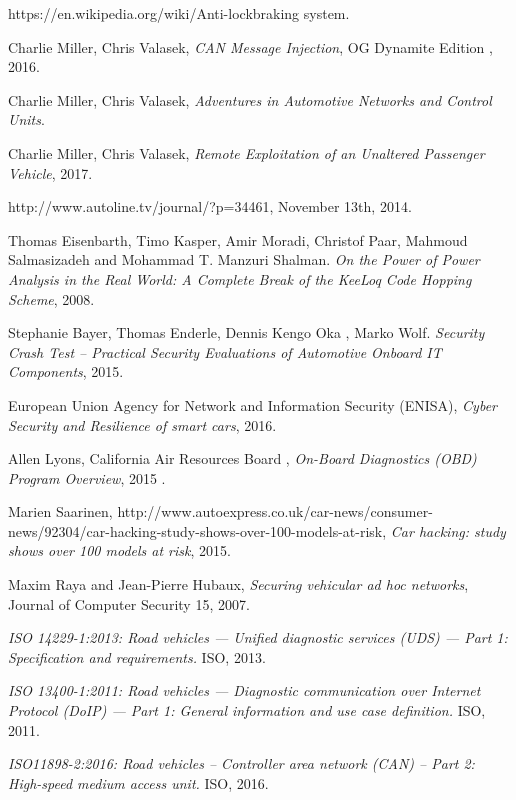 \documentclass[11pt]{article}
\begin{document}
\begin{thebibliography}{10}
	https://en.wikipedia.org/wiki/Anti-lock\textunderscore braking \textunderscore system.
	
	Charlie Miller, Chris Valasek,
	\textit{CAN Message Injection},
	OG Dynamite Edition
	, 2016.

	Charlie Miller, Chris Valasek,
	\textit{Adventures in Automotive Networks and Control Units}.
	
	Charlie Miller, Chris Valasek,
	\textit{Remote Exploitation of an Unaltered Passenger Vehicle}, 2017.
	
	http://www.autoline.tv/journal/?p=34461, November 13th, 2014.
	
	Thomas Eisenbarth, Timo Kasper, Amir Moradi, Christof Paar, Mahmoud Salmasizadeh and Mohammad T. Manzuri Shalman.
	\textit{On the Power of Power Analysis in the Real World: A Complete Break of the KeeLoq Code Hopping Scheme}, 2008.
	
	Stephanie Bayer, Thomas Enderle, Dennis Kengo Oka , Marko Wolf.
	\textit{Security Crash Test – Practical Security Evaluations of Automotive Onboard IT Components}, 2015.
	
	European Union Agency for Network and Information Security (ENISA),
	\textit{Cyber Security and Resilience of smart cars},
	2016.
	
	Allen Lyons, California Air Resources Board ,
	\textit{On-Board Diagnostics (OBD) Program Overview},
	2015 .
	
	Marien Saarinen, http://www.autoexpress.co.uk/car-news/consumer-news/92304/car-hacking-study-shows-over-100-models-at-risk, 
	\textit{Car hacking: study shows over 100 models at risk},
	2015.
	
	Maxim Raya and Jean-Pierre Hubaux, \textit{Securing vehicular ad hoc networks}, Journal of Computer Security 15, 2007.

	\textit{ISO 14229-1:2013: Road vehicles — Unified diagnostic services (UDS) — Part 1: Specification and requirements.}
	ISO, 2013.
	
	\textit{ISO 13400-1:2011: Road vehicles — Diagnostic communication over Internet Protocol (DoIP) — Part 1: General information and use case definition.} ISO, 2011.
	
	\textit{ISO11898-2:2016: Road vehicles -- Controller area network (CAN) -- Part 2: High-speed medium access unit.} ISO, 2016.
	

\end{thebibliography}
\end{document}

